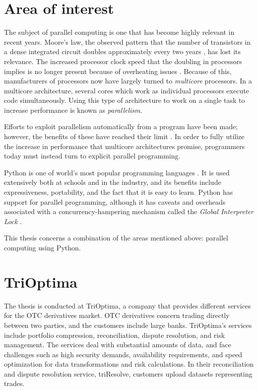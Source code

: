 \section{Area of interest}
The subject of parallel computing is one that has become highly relevant in recent years.
Moore's law, the observed pattern that the number of transistors in a dense integrated circuit doubles approximately every two
years \cite{moore_1998_cramming_cmcoic},
has lost its relevance. The increased processor clock speed that the doubling in processors implies is no longer present because of
overheating issues \cite[p. 1]{herlihy_2012_art_taomprr}. Because of this, manufacturers of processors now have
largely turned to \emph{multicore} processors. In a multicore architecture, several cores which work as individual processors execute
code simultaneously. Using this type of architecture to work on a single task to increase performance is known as \emph{parallelism}.

Efforts to exploit parallelism automatically from a program have been made; however, the benefits of these have reached their
limit \cite[p. 7-12]{mccool_2012_structured_spppfec}. In order to fully utilize the increase in performance that multicore
architectures promise, programmers today must instead turn to explicit parallel programming.

Python is one of world's most popular programming languages \cite{krill_2015_python_psnhilp}. It is used extensively both at schools and
in the industry, and its benefits include expressiveness, portability, and the fact that it is easy to learn. Python has support for
parallel programming, although it has caveats and overheads associated with a concurrency-hampering mechanism called the
\emph{Global Interpreter Lock} \cite{beazley_150745UTC_introduction_aitpc}.

This thesis concerns a combination of the areas mentioned above: parallel computing using Python.

\section{TriOptima} \label{trioptima}
The thesis is conducted at TriOptima, a company that provides different services for the OTC derivatives market.
OTC derivatives concern trading directly between two parties, and the customers include large banks. TriOptima’s services
include portfolio compression, reconciliation, dispute resolution, and risk management. The services deal with substantial
amounts of data, and face challenges such as high security demands, availability requirements, and speed optimization
for data transformations and risk calculations. In their reconciliation and dispute resolution service,
triResolve, customers upload datasets representing trades. 

